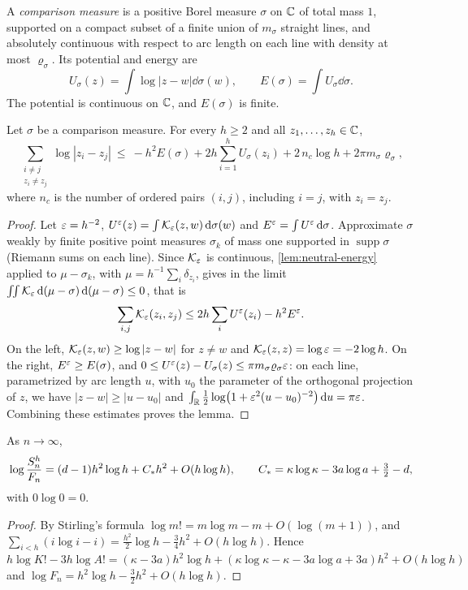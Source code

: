 A \emph{comparison measure} is a positive Borel measure $\sigma$ on $\mathbb{C}$ of total mass $1$, supported on a compact subset of a finite union of $m_\sigma$ straight lines, and absolutely continuous with respect to arc length on each line with density at most $\varrho_\sigma$. Its potential and energy are
\[
U_\sigma(z)=\int\log|z-w|\dd\sigma(w),\qquad E(\sigma)=\int U_\sigma\dd\sigma .
\]
The potential is continuous on $\mathbb{C}$, and $E(\sigma)$ is finite.

\begin{lemma}\label{lem:energy-comparison}
Let $\sigma$ be a comparison measure. For every $h\ge2$ and all $z_1,\dots,z_h\in\mathbb{C}$,
\[
\sum_{\substack{i\ne j\\ z_i\ne z_j}}\log|z_i-z_j|\ \le\ -h^2E(\sigma)+2h\sum_{i=1}^hU_\sigma(z_i)+2\,n_c\log h+2\pi m_\sigma\varrho_\sigma,
\]
where $n_c$ is the number of ordered pairs $(i,j)$, including $i=j$, with $z_i=z_j$.
\end{lemma}

\begin{proof}
Let $\varepsilon=h^{-2}$, $U^\varepsilon(z)=\int \mathcal K_\varepsilon(z,w)\,\mathrm{d}\sigma(w)$ and $E^\varepsilon=\int U^\varepsilon\,\mathrm{d}\sigma$. Approximate $\sigma$ weakly by finite positive point measures $\sigma_k$ of mass one supported in $\operatorname{supp}\sigma$ (Riemann sums on each line). Since $\mathcal K_\varepsilon$ is continuous, \cref{lem:neutral-energy} applied to $\mu-\sigma_k$, with $\mu=h^{-1}\sum_i\delta_{z_i}$, gives in the limit $\iint \mathcal K_\varepsilon\,\mathrm{d}(\mu-\sigma)\,\mathrm{d}(\mu-\sigma)\le0$, that is
\[
\sum_{i,j}\mathcal K_\varepsilon(z_i,z_j)\le2h\sum_iU^\varepsilon(z_i)-h^2E^\varepsilon .
\]
On the left, $\mathcal K_\varepsilon(z,w)\ge\log|z-w|$ for $z\ne w$ and $\mathcal K_\varepsilon(z,z)=\log\varepsilon=-2\log h$. On the right, $E^\varepsilon\ge E(\sigma)$, and $0\le U^\varepsilon(z)-U_\sigma(z)\le\pi m_\sigma\varrho_\sigma\varepsilon$: on each line, parametrized by arc length $u$, with $u_0$ the parameter of the orthogonal projection of $z$, we have $|z-w|\ge|u-u_0|$ and $\int_{\mathbb{R}}\frac12\log\bigl(1+\varepsilon^2(u-u_0)^{-2}\bigr)\,\mathrm{d} u=\pi\varepsilon$. Combining these estimates proves the lemma.
\end{proof}

\begin{lemma}[normalization]\label{lem:stirling}
As $n\to\infty$,
\[
\log\frac{S_n^h}{F_n}=(d-1)h^2\log h+C_{*} h^2+O(h\log h),\qquad C_{*}=\kappa\log\kappa-3a\log a+\tfrac32-d,
\]
with $0\log0=0$.
\end{lemma}

\begin{proof}
By Stirling's formula $\log m!=m\log m-m+O(\log(m+1))$, and $\sum_{i<h}(i\log i-i)=\frac{h^2}2\log h-\frac34h^2+O(h\log h)$. Hence $h\log K!-3h\log A!=(\kappa-3a)h^2\log h+(\kappa\log\kappa-\kappa-3a\log a+3a)h^2+O(h\log h)$ and $\log F_n=h^2\log h-\frac32h^2+O(h\log h)$.
\end{proof}

